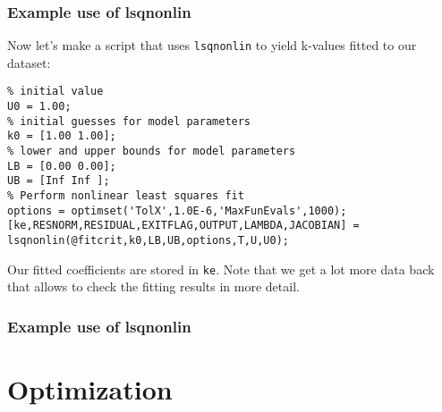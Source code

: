 \documentclass[11pt,table,final,fleqn,xcolor={usenames,dvipsnames,table}]{beamer}
\begin{document}
\begin{frame}[fragile] 
  \frametitle{Example use of lsqnonlin}
  Now let's make a script that uses \lstinline$lsqnonlin$ to yield k-values fitted to our dataset:
  \pause
  \begin{lstlisting}
% initial value
U0 = 1.00;
% initial guesses for model parameters
k0 = [1.00 1.00];
% lower and upper bounds for model parameters
LB = [0.00 0.00];
UB = [Inf Inf ];
% Perform nonlinear least squares fit
options = optimset('TolX',1.0E-6,'MaxFunEvals',1000);
[ke,RESNORM,RESIDUAL,EXITFLAG,OUTPUT,LAMBDA,JACOBIAN] = lsqnonlin(@fitcrit,k0,LB,UB,options,T,U,U0);
    \end{lstlisting}
    Our fitted coefficients are stored in \lstinline$ke$. Note that we get a lot more data back that allows to check the fitting results in more detail.
\end{frame}

\begin{frame}[fragile] 
  \frametitle{Example use of lsqnonlin}
  
\end{frame}



\section{Optimization}
\end{document}
